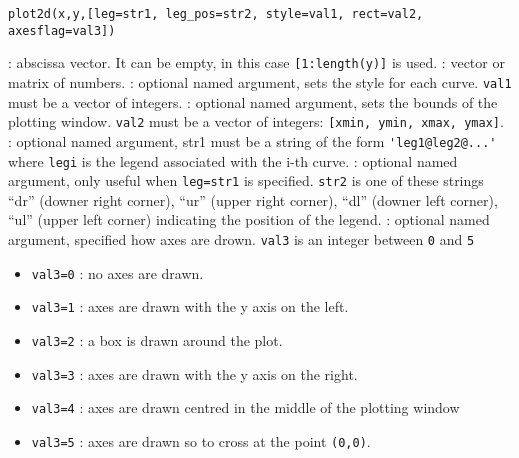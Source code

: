 
\begin{mandesc}
\end{mandesc}

\begin{calling_sequence}
\begin{verbatim}
plot2d(x,y,[leg=str1, leg_pos=str2, style=val1, rect=val2, axesflag=val3])
\end{verbatim}
\end{calling_sequence}
\begin{parameters}
  \begin{varlist}
    : abscissa vector. It can be empty, in this case \verb+[1:length(y)]+ is used.
    : vector or matrix of numbers.
    : optional named argument, sets the style for each curve. \verb+val1+
    must be a vector of integers.
    : optional named argument, sets the bounds of the plotting
    window. \verb+val2+ must be a vector of integers: \verb+[xmin, ymin, xmax, ymax]+.
    : optional named argument, str1 must be a string of the form
    \verb+'leg1@leg2@...'+ where \verb+legi+ is the legend associated with the i-th curve.
    : optional named argument, only useful when \verb+leg=str1+
    is specified. \verb+str2+ is one of these strings ``dr'' (downer right corner), ``ur'' (upper
    right corner), ``dl'' (downer left corner), ``ul'' (upper left corner)
    indicating the position of the legend.
    : optional named argument, specified how axes are
    drown. \verb+val3+ is an integer between \verb+0+ and \verb+5+
    \begin{itemize}
    \item \verb+val3=0+ : no axes are drawn.
    \item \verb+val3=1+ : axes are drawn with the y axis on the left.
    \item \verb+val3=2+ : a box is drawn around the plot.
    \item \verb+val3=3+ : axes are drawn with the y axis on the right.
    \item \verb+val3=4+ : axes are drawn centred in the middle of the plotting window
    \item \verb+val3=5+ : axes are drawn so to cross at the point \verb+(0,0)+.
    \end{itemize}
  \end{varlist}
\end{parameters}

